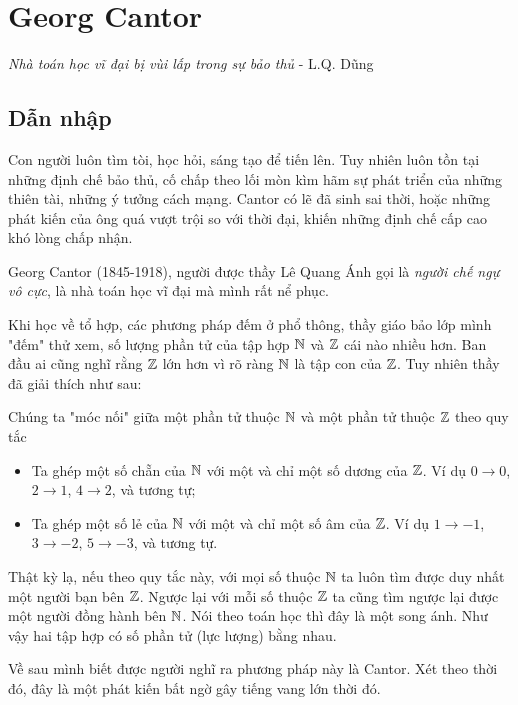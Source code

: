 \chapter{Georg Cantor}

\begin{center}
    \textit{Nhà toán học vĩ đại bị vùi lấp trong sự bảo thủ} - L.Q. Dũng
\end{center}

\section{Dẫn nhập}

Con người luôn tìm tòi, học hỏi, sáng tạo để tiến lên.
Tuy nhiên luôn tồn tại những định chế bảo thủ, cố chấp theo
lối mòn kìm hãm sự phát triển của những thiên tài, những ý 
tưởng cách mạng. Cantor có lẽ đã sinh sai thời, hoặc những phát kiến của ông
quá vượt trội so với thời đại, khiến những định chế cấp cao
khó lòng chấp nhận.

Georg Cantor (1845-1918), người được thầy Lê Quang Ánh gọi 
là \textit{người chế ngự vô cực}, là nhà toán học vĩ đại mà
mình rất nể phục.

Khi học về tổ hợp, các phương pháp đếm ở phổ thông, thầy giáo bảo lớp mình
"đếm" thử xem, số lượng phần tử của tập hợp $\mathbb{N}$ và $\mathbb{Z}$ cái
nào nhiều hơn. Ban đầu ai cũng nghĩ rằng $\mathbb{Z}$ lớn hơn vì rõ ràng
$\mathbb{N}$ là tập con của $\mathbb{Z}$. Tuy nhiên thầy đã giải thích như sau:

Chúng ta "móc nối" giữa một phần tử thuộc $\mathbb{N}$ và một phần tử thuộc $\mathbb{Z}$
theo quy tắc
\begin{itemize}[noitemsep]
    \item Ta ghép một số chẵn của $\mathbb{N}$ với một và chỉ một số dương của $\mathbb{Z}$.
    Ví dụ $0 \to 0$, $2 \to 1$, $4 \to 2$, và tương tự;
    \item Ta ghép một số lẻ của $\mathbb{N}$ với một và chỉ một số âm của $\mathbb{Z}$.
    Ví dụ $1 \to -1$, $3 \to -2$, $5 \to -3$, và tương tự.
\end{itemize}

Thật kỳ lạ, nếu theo quy tắc này, với mọi số thuộc $\mathbb{N}$ ta luôn tìm được 
duy nhất một người bạn bên $\mathbb{Z}$. Ngược lại với mỗi số thuộc $\mathbb{Z}$ ta cũng
tìm ngược lại được một người đồng hành bên $\mathbb{N}$. Nói theo toán học thì 
đây là một song ánh. Như vậy hai tập hợp có số phần tử (lực lượng) bằng nhau.

Về sau mình biết được người nghĩ ra phương pháp này là Cantor.
Xét theo thời đó, đây là một phát kiến bất ngờ gây tiếng vang 
lớn thời đó.

